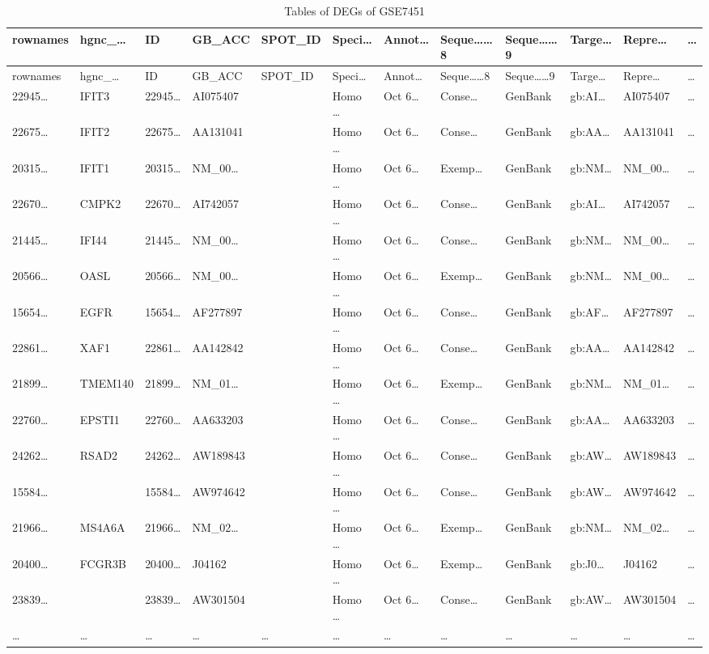 \documentclass[
]{article}
\begin{document}
\begin{longtable}[]{@{}llllllllllll@{}}
\caption{\label{tab:tables-of-DEGs-of-GSE7451}Tables of DEGs of GSE7451}\tabularnewline
\toprule
rownames & hgnc\_\ldots{} & ID & GB\_ACC & SPOT\_ID & Speci\ldots{} & Annot\ldots{} & Seque\ldots\ldots8 & Seque\ldots\ldots9 & Targe\ldots{} & Repre\ldots{} & \ldots{}\tabularnewline
\midrule
\endfirsthead
\toprule
rownames & hgnc\_\ldots{} & ID & GB\_ACC & SPOT\_ID & Speci\ldots{} & Annot\ldots{} & Seque\ldots\ldots8 & Seque\ldots\ldots9 & Targe\ldots{} & Repre\ldots{} & \ldots{}\tabularnewline
\midrule
\endhead
22945\ldots{} & IFIT3 & 22945\ldots{} & AI075407 & & Homo \ldots{} & Oct 6\ldots{} & Conse\ldots{} & GenBank & gb:AI\ldots{} & AI075407 & \ldots{}\tabularnewline
22675\ldots{} & IFIT2 & 22675\ldots{} & AA131041 & & Homo \ldots{} & Oct 6\ldots{} & Conse\ldots{} & GenBank & gb:AA\ldots{} & AA131041 & \ldots{}\tabularnewline
20315\ldots{} & IFIT1 & 20315\ldots{} & NM\_00\ldots{} & & Homo \ldots{} & Oct 6\ldots{} & Exemp\ldots{} & GenBank & gb:NM\ldots{} & NM\_00\ldots{} & \ldots{}\tabularnewline
22670\ldots{} & CMPK2 & 22670\ldots{} & AI742057 & & Homo \ldots{} & Oct 6\ldots{} & Conse\ldots{} & GenBank & gb:AI\ldots{} & AI742057 & \ldots{}\tabularnewline
21445\ldots{} & IFI44 & 21445\ldots{} & NM\_00\ldots{} & & Homo \ldots{} & Oct 6\ldots{} & Conse\ldots{} & GenBank & gb:NM\ldots{} & NM\_00\ldots{} & \ldots{}\tabularnewline
20566\ldots{} & OASL & 20566\ldots{} & NM\_00\ldots{} & & Homo \ldots{} & Oct 6\ldots{} & Exemp\ldots{} & GenBank & gb:NM\ldots{} & NM\_00\ldots{} & \ldots{}\tabularnewline
15654\ldots{} & EGFR & 15654\ldots{} & AF277897 & & Homo \ldots{} & Oct 6\ldots{} & Conse\ldots{} & GenBank & gb:AF\ldots{} & AF277897 & \ldots{}\tabularnewline
22861\ldots{} & XAF1 & 22861\ldots{} & AA142842 & & Homo \ldots{} & Oct 6\ldots{} & Conse\ldots{} & GenBank & gb:AA\ldots{} & AA142842 & \ldots{}\tabularnewline
21899\ldots{} & TMEM140 & 21899\ldots{} & NM\_01\ldots{} & & Homo \ldots{} & Oct 6\ldots{} & Exemp\ldots{} & GenBank & gb:NM\ldots{} & NM\_01\ldots{} & \ldots{}\tabularnewline
22760\ldots{} & EPSTI1 & 22760\ldots{} & AA633203 & & Homo \ldots{} & Oct 6\ldots{} & Conse\ldots{} & GenBank & gb:AA\ldots{} & AA633203 & \ldots{}\tabularnewline
24262\ldots{} & RSAD2 & 24262\ldots{} & AW189843 & & Homo \ldots{} & Oct 6\ldots{} & Conse\ldots{} & GenBank & gb:AW\ldots{} & AW189843 & \ldots{}\tabularnewline
15584\ldots{} & & 15584\ldots{} & AW974642 & & Homo \ldots{} & Oct 6\ldots{} & Conse\ldots{} & GenBank & gb:AW\ldots{} & AW974642 & \ldots{}\tabularnewline
21966\ldots{} & MS4A6A & 21966\ldots{} & NM\_02\ldots{} & & Homo \ldots{} & Oct 6\ldots{} & Exemp\ldots{} & GenBank & gb:NM\ldots{} & NM\_02\ldots{} & \ldots{}\tabularnewline
20400\ldots{} & FCGR3B & 20400\ldots{} & J04162 & & Homo \ldots{} & Oct 6\ldots{} & Exemp\ldots{} & GenBank & gb:J0\ldots{} & J04162 & \ldots{}\tabularnewline
23839\ldots{} & & 23839\ldots{} & AW301504 & & Homo \ldots{} & Oct 6\ldots{} & Conse\ldots{} & GenBank & gb:AW\ldots{} & AW301504 & \ldots{}\tabularnewline
\ldots{} & \ldots{} & \ldots{} & \ldots{} & \ldots{} & \ldots{} & \ldots{} & \ldots{} & \ldots{} & \ldots{} & \ldots{} & \ldots{}\tabularnewline
\bottomrule
\end{longtable}
\end{document}
